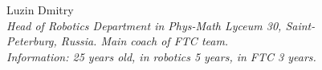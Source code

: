 \begin{figure}[H]
	
	\begin{minipage}[h]{0.47\linewidth}
		Luzin Dmitry\\
		\emph{Head of Robotics Department in Phys-Math Lyceum 30, Saint-Peterburg, Russia. Main coach of FTC team.\\}
		\emph{Information: 25 years old, in robotics 5 years, in FTC 3 years.}
	\end{minipage}
	\hfill
	\begin{minipage}{0.47\linewidth}
		\\
	\end{minipage}
	\vfill
	\begin{minipage}[h]{0.47\linewidth}

\end{minipage}
\end{figure}
